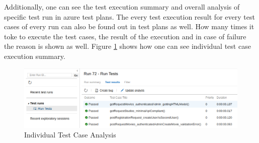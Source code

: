 Additionally, one can see the test execution summary and overall analysis of specific test run in azure test plans. The every test execution result for every test cases of every run can also be found out in test plans as well. How many times it toke to execute the test cases, the result of the execution and in case of failure the reason is shown as well. Figure \ref{fig:specific_test_case} shows how one can see individual test case execution summary.

\begin{figure}[h]
\includegraphics[scale=0.40]{images/mehedi/specificTestCases.png}
\centering
\caption{Individual Test Case Analysis}
\label{fig:specific_test_case}
\end{figure}
